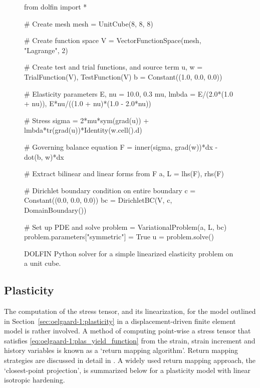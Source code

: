 \begin{figure}
\begin{python}
from dolfin import *

# Create mesh
mesh = UnitCube(8, 8, 8)

# Create function space
V = VectorFunctionSpace(mesh, "Lagrange", 2)

# Create test and trial functions, and source term
u, w = TrialFunction(V), TestFunction(V)
b = Constant((1.0, 0.0, 0.0))

# Elasticity parameters
E, nu = 10.0, 0.3
mu, lmbda = E/(2.0*(1.0 + nu)), E*nu/((1.0 + nu)*(1.0 - 2.0*nu))

# Stress
sigma = 2*mu*sym(grad(u)) + lmbda*tr(grad(u))*Identity(w.cell().d)

# Governing balance equation
F = inner(sigma, grad(w))*dx - dot(b, w)*dx

# Extract bilinear and linear forms from F
a, L = lhs(F), rhs(F)

# Dirichlet boundary condition on entire boundary
c  = Constant((0.0, 0.0, 0.0))
bc = DirichletBC(V, c, DomainBoundary())

# Set up PDE and solve
problem = VariationalProblem(a, L, bc)
problem.parameters["symmetric"] = True
u = problem.solve()
\end{python}
\caption{DOLFIN Python solver for a simple linearized elasticity problem
on a unit cube.}
\label{fig:oelgaard-1:elas_code}
\end{figure}

\subsection{Plasticity}
\label{sec:oelgaard-1:examples_plasticity}

The computation of the stress tensor, and its linearization,
for the model outlined in Section~\ref{sec:oelgaard-1:plasticity}
in a displacement-driven finite element model is rather involved.
A method of computing point-wise a stress tensor that satisfies
\eqref{eq:oelgaard-1:plas_yield_function} from the strain, strain
increment and history variables is known as a `return mapping
algorithm'.  Return mapping strategies are discussed in detail in
\citet{SimoHughes1998}.  A widely used return mapping approach, the
`closest-point projection', is summarized below for a plasticity model
with linear isotropic hardening.

